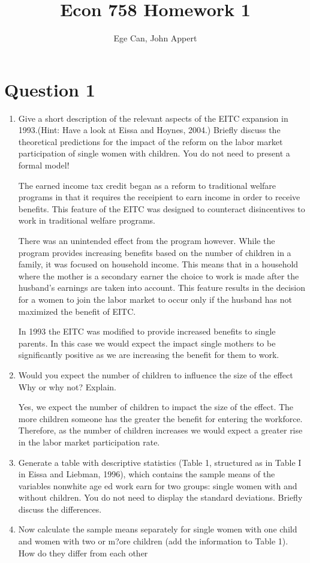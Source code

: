 \documentclass{article}
\begin{document}
\title{Econ 758 Homework 1}
\author{Ege Can, John Appert}
\maketitle

\section{Question 1}

\begin{enumerate}[label=\alph*]
\item Give a short description of the relevant aspects of the EITC expansion in 1993.(Hint: Have a look at Eissa and Hoynes, 2004.) Briefly discuss the theoretical predictions for the impact of the reform on the labor market participation of  single women with children. You do  not need  to present a formal model!

The earned income tax credit began as a reform to traditional welfare programs in that it requires the receipient to earn income in order to receive benefits.  This feature of the EITC was designed to counteract disincentives to work in traditional welfare programs.

There was an unintended effect from the program however.  While the program provides increasing benefits based on the number of children in a family, it was focused on household income.  This means that in a household where the mother is a secondary earner the choice to work is made after the husband's earnings are taken into account.  This feature results in the decision for a women to join the labor market to occur only if the husband has not maximized the benefit of EITC.  

In 1993 the EITC was modified to provide increased benefits to single parents.  In this case we would expect the impact single mothers to be significantly positive as we are increasing the benefit for them to work.

\item Would you expect the number of children to influence the size of the effect Why or why not? Explain.

Yes, we expect the number of children to impact the size of the effect.  The more children someone has the greater the benefit for entering the workforce.  Therefore, as the number of children increases we would expect a greater rise in the labor market participation rate.


\item  Generate a table with descriptive statistics (Table 1, structured as in Table I in Eissa and Liebman, 1996), which contains the sample means of the variables nonwhite age ed work  earn  for  two groups: single women with and without children. You do not need to display the  standard deviations. Briefly discuss the differences.

\item  Now calculate the sample means separately for single women with one child and women with two or m?ore children (add the information to Table 1). How do they differ from each other

\end{enumerate}
\end{document}
